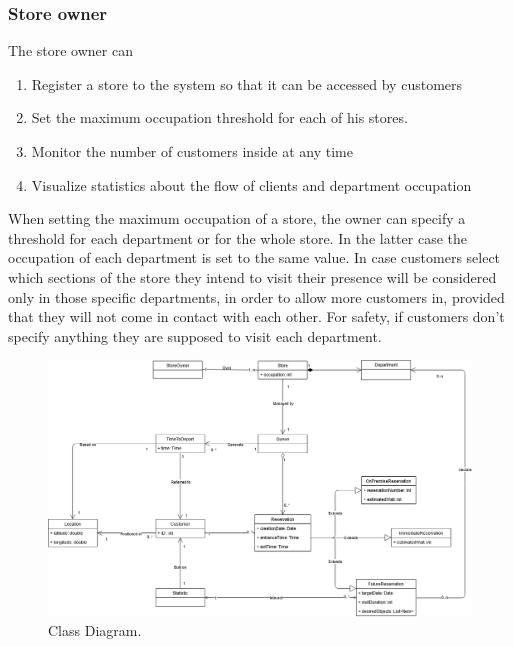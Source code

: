 \subsubsection{Store owner}
The store owner can
\begin{enumerate}
	\item Register a store to the system so that it can be accessed by customers
	\item Set the maximum occupation threshold for each of his stores.
	\item Monitor the number of customers inside at any time
	\item Visualize statistics about the flow of clients and department occupation
\end{enumerate}
When setting the maximum occupation of a store, the owner can specify a threshold for each department or for the whole store. In the latter case the occupation of each department is set to the same value. In case customers select which sections of the store they intend to visit their presence will be considered only in those specific departments, in order to allow more customers in, provided that they will not come in contact with each other. For safety, if customers don't specify anything they are supposed to visit each department.
\begin{figure}[!htb]
\centering
\includegraphics[width=\textwidth]{Images/ClassDiagram.png}
\caption{\label{fig:metamodel2}Class Diagram.}
\end{figure}
\newpage
